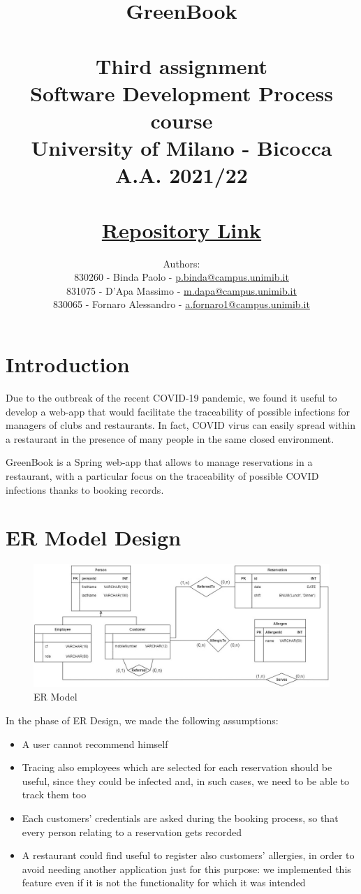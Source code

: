 \documentclass{article}
\title{\textbf{GreenBook}\\~\\
    Third assignment\\
    \small Software Development Process course\\
        University of Milano - Bicocca\\
        A.A. 2021/22\\~\\
        \href{https://gitlab.com/massimino96/2021_assignment3_greenbook/}{Repository Link}}
\author{Authors:\\
    830260 - Binda Paolo - \href{mailto:p.binda@campus.unimib.it}{p.binda@campus.unimib.it}\\
    831075 - D'Apa Massimo - \href{mailto:m.dapa@campus.unimib.it}{m.dapa@campus.unimib.it}\\
    830065 - Fornaro Alessandro - \href{mailto:a.fornaro1@campus.unimib.it}{a.fornaro1@campus.unimib.it}}
\date{}
\begin{document}
\setlength{\parindent}{0em}
\setlength{\parskip}{1em}

\maketitle
\thispagestyle{empty}

\cleardoublepage
\setcounter{page}{1}

\section*{Introduction}

Due to the outbreak of the recent COVID-19 pandemic, we found it useful to develop a web-app that would facilitate the traceability of possible infections for managers of clubs and restaurants. In fact, COVID virus can easily spread within a restaurant in the presence of many people in the same closed environment.

GreenBook is a Spring web-app that allows to manage reservations in a restaurant, with a particular focus on the traceability of possible COVID infections thanks to booking records.

\section*{ER Model Design}
\begin{figure}[H]
    \centering
    \includegraphics[width=\textwidth]{ER}
    \caption{ER Model}
    \label{fig:ermodel}
\end{figure}

In the phase of ER Design, we made the following assumptions:
\begin{itemize}
  \item A user cannot recommend himself
  \item Tracing also employees which are selected for each reservation should be useful, since they could be infected and, in such cases, we need to be able to track them too
  \item Each customers' credentials are asked during the booking process, so that every person relating to a reservation gets recorded
  \item A restaurant could find useful to register also customers' allergies, 
  in order to avoid needing another application just for this purpose: we implemented this feature even if it is not the functionality for which it was intended
\end{itemize}
\end{document}
